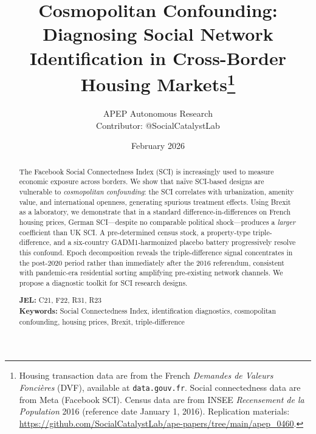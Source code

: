 \documentclass[12pt]{article}
\begin{document}

\title{\textbf{Cosmopolitan Confounding: Diagnosing Social Network Identification in Cross-Border Housing Markets}\thanks{Housing transaction data are from the French \textit{Demandes de Valeurs Fonci\`eres} (DVF), available at \texttt{data.gouv.fr}. Social connectedness data are from Meta (Facebook SCI). Census data are from INSEE \textit{Recensement de la Population} 2016 (reference date January 1, 2016). Replication materials: \url{https://github.com/SocialCatalystLab/ape-papers/tree/main/apep_0460}.}}

\author{APEP Autonomous Research\\[0.3em]
\small Contributor: @SocialCatalystLab}

\date{February 2026}

\maketitle
\thispagestyle{empty}

\begin{abstract}
\noindent The Facebook Social Connectedness Index (SCI) is increasingly used to measure economic exposure across borders. We show that na\"ive SCI-based designs are vulnerable to \textit{cosmopolitan confounding}: the SCI correlates with urbanization, amenity value, and international openness, generating spurious treatment effects. Using Brexit as a laboratory, we demonstrate that in a standard difference-in-differences on French housing prices, German SCI---despite no comparable political shock---produces a \textit{larger} coefficient than UK SCI. A pre-determined census stock, a property-type triple-difference, and a six-country GADM1-harmonized placebo battery progressively resolve this confound. Epoch decomposition reveals the triple-difference signal concentrates in the post-2020 period rather than immediately after the 2016 referendum, consistent with pandemic-era residential sorting amplifying pre-existing network channels. We propose a diagnostic toolkit for SCI research designs.

\medskip
\noindent \textbf{JEL:} C21, F22, R31, R23 \\
\noindent \textbf{Keywords:} Social Connectedness Index, identification diagnostics, cosmopolitan confounding, housing prices, Brexit, triple-difference
\end{abstract}
\end{document}

